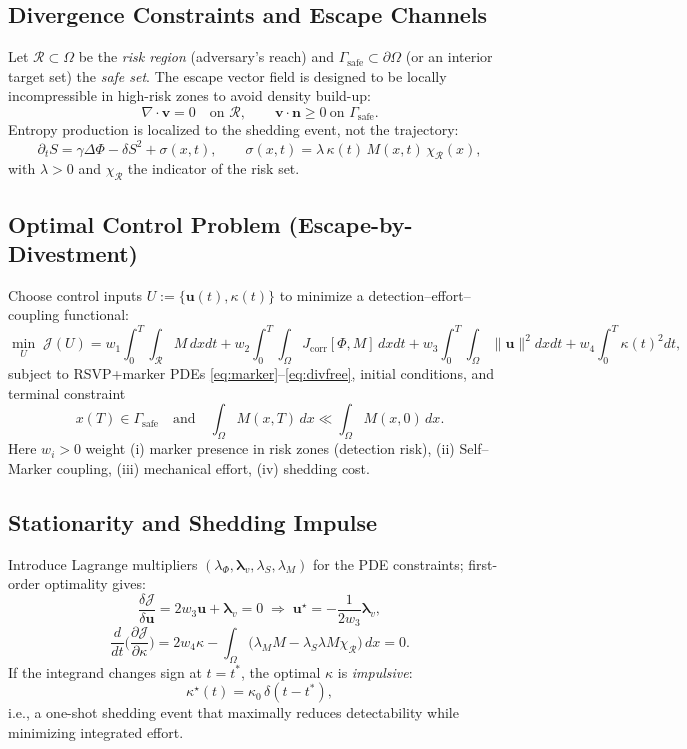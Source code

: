 \documentclass[a4paper,11pt,openany]{book}
\begin{document}
\subsection{Divergence Constraints and Escape Channels}
Let $\mathcal{R}\subset\Omega$ be the \emph{risk region} (adversary’s reach) and $\Gamma_{\text{safe}}\subset\partial\Omega$ (or an interior target set) the \emph{safe set}. The escape vector field is designed to be locally incompressible in high-risk zones to avoid density build-up:
\begin{equation}
\label{eq:divfree}
\nabla\!\cdot \mathbf{v} = 0 \quad \text{on } \mathcal{R}, 
\qquad \mathbf{v}\cdot \mathbf{n} \ge 0 \ \text{on } \Gamma_{\text{safe}}.
\end{equation}
Entropy production is localized to the shedding event, not the trajectory:
\[
\partial_t S = \gamma \Delta \Phi - \delta S^2 + \sigma(x,t), \qquad
\sigma(x,t)=\lambda\,\kappa(t)\,M(x,t)\,\chi_{\mathcal{R}}(x),
\]
with $\lambda>0$ and $\chi_{\mathcal{R}}$ the indicator of the risk set.

\subsection{Optimal Control Problem (Escape-by-Divestment)}
Choose control inputs $U:=\{\mathbf{u}(t),\kappa(t)\}$ to minimize a detection–effort–coupling functional:
\begin{equation}
\label{eq:ocp}
\min_{U}\; \mathcal{J}(U) 
= w_1 \!\int_0^T \!\!\int_{\mathcal{R}} \!\! M\,dxdt 
+ w_2 \!\int_0^T \!\!\int_{\Omega}\! J_{\text{corr}}[\Phi,M]\,dxdt
+ w_3 \!\int_0^T \!\!\int_{\Omega}\! \|\mathbf{u}\|^2 dxdt
+ w_4 \!\int_0^T \kappa(t)^2 dt,
\end{equation}
subject to RSVP+marker PDEs \eqref{eq:marker}–\eqref{eq:divfree}, initial conditions, and terminal constraint
\[
x(T)\in \Gamma_{\text{safe}} \quad \text{and}\quad \int_{\Omega} M(x,T)\,dx \ll \int_{\Omega} M(x,0)\,dx.
\]
Here $w_i>0$ weight (i) marker presence in risk zones (detection risk), (ii) Self–Marker coupling, (iii) mechanical effort, (iv) shedding cost.

\subsection{Stationarity and Shedding Impulse}
Introduce Lagrange multipliers $(\lambda_\Phi,\boldsymbol{\lambda}_v,\lambda_S,\lambda_M)$ for the PDE constraints; first-order optimality gives:
\[
\frac{\delta \mathcal{J}}{\delta \mathbf{u}} = 2 w_3 \mathbf{u} + \boldsymbol{\lambda}_v = 0 \;\Rightarrow\; \mathbf{u}^\star = -\frac{1}{2w_3}\boldsymbol{\lambda}_v,
\]
\[
\frac{d}{dt}\Big(\frac{\partial \mathcal{J}}{\partial \kappa}\Big) = 2 w_4 \kappa - \int_{\Omega}\big(\lambda_M M - \lambda_S \lambda M \chi_{\mathcal{R}}\big)\,dx = 0.
\]
If the integrand changes sign at $t=t^\ast$, the optimal $\kappa$ is \emph{impulsive}:
\[
\kappa^\star(t) = \kappa_0\,\delta(t-t^\ast),
\]
i.e., a one-shot shedding event that maximally reduces detectability while minimizing integrated effort.
\end{document}
